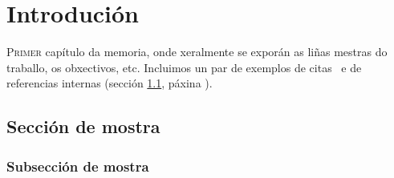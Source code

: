%

\chapter{Introdución}
\label{chap:introducion}

\lettrine{P}{rimer} capítulo da memoria, onde xeralmente se exporán as
liñas mestras do traballo, os obxectivos, etc. Incluimos un par de
exemplos de citas~\cite{ErlangBook,ErlangWebBook} e de referencias
internas (sección \ref{sec:mostra}, páxina \pageref{sec:mostra}).

\Blindtext

\section{Sección de mostra}
\label{sec:mostra}

\Blindtext

\subsection{Subsección de mostra}

\Blindtext
